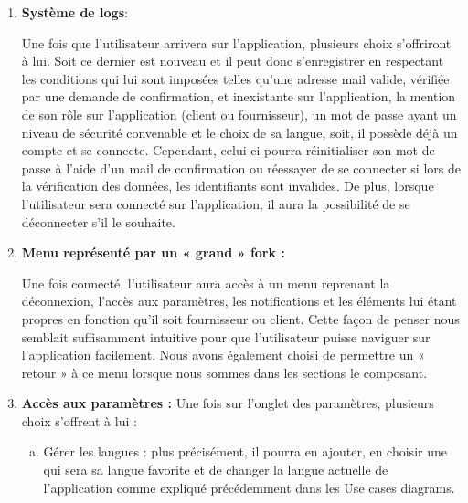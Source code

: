 \begin{enumerate}[1.]
\item  \textbf{Système de logs}: 

\newline
Une fois que l’utilisateur arrivera sur l’application, plusieurs choix s’offriront à lui. Soit ce dernier est nouveau et il peut donc s’enregistrer en respectant les conditions qui lui sont imposées telles qu’une adresse mail valide, vérifiée par une demande de confirmation, et inexistante sur l’application, la mention de son rôle sur l’application (client ou fournisseur), un mot de passe ayant un niveau de sécurité convenable et le choix de sa langue, soit, il possède déjà un compte et se connecte. 
\newline
Cependant, celui-ci pourra réinitialiser son mot de passe à l’aide d’un mail de confirmation ou réessayer de se connecter si lors de la vérification des données, les identifiants sont invalides.
\newline
De plus, lorsque l’utilisateur sera connecté sur l’application, il aura la possibilité de se déconnecter s’il le souhaite.

\newline
\newline

\item \textbf{Menu représenté par un « grand » fork :}

\newline
Une fois connecté, l’utilisateur aura accès à un menu reprenant la déconnexion, l’accès aux paramètres, les notifications et les éléments lui étant propres en fonction qu’il soit fournisseur ou client. 
Cette façon de penser nous semblait suffisamment intuitive pour que l’utilisateur puisse naviguer sur l’application facilement. 
Nous avons également choisi de permettre un « retour » à ce menu lorsque nous sommes dans les sections le composant.

\newline
\newline

\item \textbf{Accès aux paramètres :}
\newline
Une fois sur l’onglet des paramètres, plusieurs choix s’offrent à lui : 

\begin{enumerate}[a)]
\newline
\item Gérer les langues : plus précisément, il pourra en ajouter, en choisir une qui sera sa langue favorite et de changer la langue actuelle de l'application comme expliqué précédemment dans les Use cases diagrams.


\end{enumerate}
\end{enumerate}
